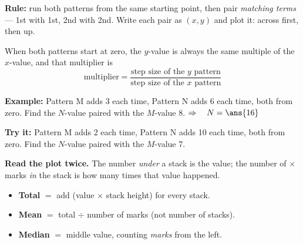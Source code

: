 \documentclass[12pt]{article}
\begin{document}


\begin{formulabox}
\textbf{Rule:} run both patterns from the same starting point, then pair \emph{matching
terms} --- 1st with 1st, 2nd with 2nd. Write each pair as $(x, y)$ and plot it: across
first, then up.\par
\smallskip
When both patterns start at zero, the $y$-value is always the same multiple of the
$x$-value, and that multiplier is
\[ \text{multiplier} = \frac{\text{step size of the } y \text{ pattern}}
                            {\text{step size of the } x \text{ pattern}} \]
\end{formulabox}

\begin{examplebox}
\textbf{Example:} \quad Pattern M adds 3 each time, Pattern N adds 6 each time, both from
zero. Find the $N$-value paired with the $M$-value 8.
$\Rightarrow\quad N = \ans{16}$
\end{examplebox}

\begin{tryitbox}
\textbf{Try it:} \quad Pattern M adds 2 each time, Pattern N adds 10 each time, both from
zero. Find the $N$-value paired with the $M$-value 7.\\[2pt]
\end{tryitbox}


\begin{formulabox}
\textbf{Read the plot twice.} The number \emph{under} a stack is the value; the number of
$\times$ marks \emph{in} the stack is how many times that value happened.\par
\smallskip
\begin{itemize}[label={$\bullet$}, leftmargin=1.1cm, itemsep=1pt, topsep=2pt]
  \item \textbf{Total} $=$ add (value $\times$ stack height) for every stack.
  \item \textbf{Mean} $=$ total $\div$ number of marks (not number of stacks).
  \item \textbf{Median} $=$ middle value, counting \emph{marks} from the left.
\end{itemize}
\end{formulabox}
\end{document}
